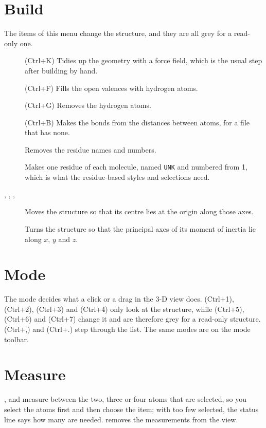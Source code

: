 \section{Build}
The items of this menu change the structure, and they are all grey for a read-only one.
\begin{description}
	\item[] (\textsf{Ctrl+K}) Tidies up the geometry with a force field, which is the usual step after building by hand.
	\item[] (\textsf{Ctrl+F}) Fills the open valences with hydrogen atoms.
	\item[] (\textsf{Ctrl+G}) Removes the hydrogen atoms.
	\item[] (\textsf{Ctrl+B}) Makes the bonds from the distances between atoms, for a file that has none.
	\item[] Removes the residue names and numbers.
	\item[] Makes one residue of each molecule, named \texttt{UNK} and numbered from 1, which is what the residue-based styles and selections need.
	\item[, , , ] Moves the structure so that its centre lies at the origin along those axes.
	\item[] Turns the structure so that the principal axes of its moment of inertia lie along $x$, $y$ and $z$.
\end{description}

\section{Mode}
The mode decides what a click or a drag in the 3-D view does.  (\textsf{Ctrl+1}),  (\textsf{Ctrl+2}),  (\textsf{Ctrl+3}) and  (\textsf{Ctrl+4}) only look at the structure, while  (\textsf{Ctrl+5}),  (\textsf{Ctrl+6}) and  (\textsf{Ctrl+7}) change it and are therefore grey for a read-only structure.  (\textsf{Ctrl+,}) and  (\textsf{Ctrl+.}) step through the list. The same modes are on the mode toolbar.

\section{Measure}
,  and  measure between the two, three or four atoms that are selected, so you select the atoms first and then choose the item; with too few selected, the status line says how many are needed.  removes the measurements from the view.


